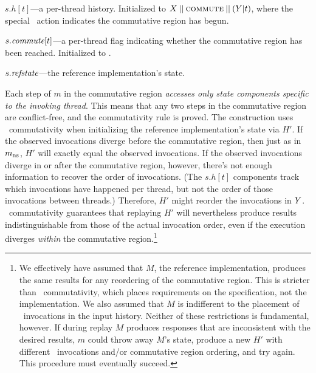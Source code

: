 \begin{CompactItemize}
\item $s.h[t]$---a per-thread history. Initialized to
  $X\mathbin{||}\textsc{commute}\mathbin{||}(Y|t)$, where the special
  \COMMUTE\ action indicates the commutative region has begun.
\item $s.\textit{commute}[t]$---a per-thread flag indicating whether the
  commutative region has been reached. Initialized to \FALSE.
\item $s.\textit{refstate}$---the reference implementation's state.
\end{CompactItemize}

\noindent%
Each step of $m$ in the commutative region \emph{accesses
only state components specific to the invoking thread}.
%
This means that any two steps in the commutative region are
conflict-free, and the commutativity rule is proved.
%
The construction uses \SIM\ commutativity when initializing the
reference implementation's state via $H'$.
%
If the observed invocations diverge before the commutative region, then
just as in $m_{\text{ns}}$, $H'$ will exactly equal the observed invocations.
%
If the observed invocations diverge in or after the commutative region,
however, there's not enough information to recover the order of
invocations. (The $s.h[t]$ components track which invocations have
happened per thread, but not the order of those invocations between
threads.) Therefore, $H'$ might reorder the invocations in $Y$.
%
\SIM\ commutativity guarantees that replaying $H'$ will nevertheless produce
results indistinguishable from those of the actual invocation order,
even if the execution
diverges \emph{within} the commutative region.\footnote{%
  We effectively have assumed that $M$, the reference
  implementation, produces the same results for any reordering of the
  commutative region. This is stricter than \SIM\ commutativity, which
  places requirements on the {specification}, not the
  implementation. We also assumed that $M$ is indifferent to the
  placement of \CONTINUE\ invocations in
  the input history.  Neither of these restrictions is fundamental, however.  If
  during replay $M$ produces responses that are inconsistent with the
  desired results, $m$ could throw away $M$'s state, produce a new $H'$
  with different \CONTINUE\ invocations and/or commutative region ordering,
  and try again.
  This procedure must eventually succeed.}

